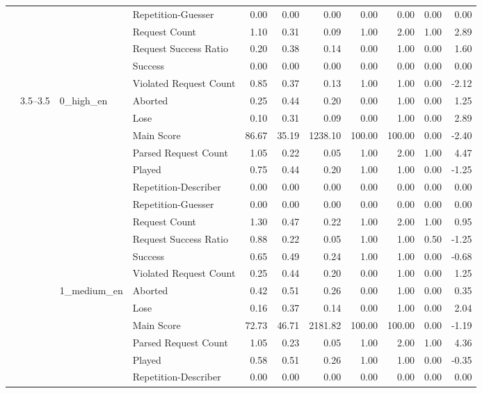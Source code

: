 \begin{tabular}{llllrrrrrrr}
 &  &  & Repetition-Guesser & 0.00 & 0.00 & 0.00 & 0.00 & 0.00 & 0.00 & 0.00 \\
 &  &  & Request Count & 1.10 & 0.31 & 0.09 & 1.00 & 2.00 & 1.00 & 2.89 \\
 &  &  & Request Success Ratio & 0.20 & 0.38 & 0.14 & 0.00 & 1.00 & 0.00 & 1.60 \\
 &  &  & Success & 0.00 & 0.00 & 0.00 & 0.00 & 0.00 & 0.00 & 0.00 \\
 &  &  & Violated Request Count & 0.85 & 0.37 & 0.13 & 1.00 & 1.00 & 0.00 & -2.12 \\
\cline{2-11} \cline{3-11}
 & \multirow[t]{33}{*}{3.5--3.5} & \multirow[t]{11}{*}{0_high_en} & Aborted & 0.25 & 0.44 & 0.20 & 0.00 & 1.00 & 0.00 & 1.25 \\
 &  &  & Lose & 0.10 & 0.31 & 0.09 & 0.00 & 1.00 & 0.00 & 2.89 \\
 &  &  & Main Score & 86.67 & 35.19 & 1238.10 & 100.00 & 100.00 & 0.00 & -2.40 \\
 &  &  & Parsed Request Count & 1.05 & 0.22 & 0.05 & 1.00 & 2.00 & 1.00 & 4.47 \\
 &  &  & Played & 0.75 & 0.44 & 0.20 & 1.00 & 1.00 & 0.00 & -1.25 \\
 &  &  & Repetition-Describer & 0.00 & 0.00 & 0.00 & 0.00 & 0.00 & 0.00 & 0.00 \\
 &  &  & Repetition-Guesser & 0.00 & 0.00 & 0.00 & 0.00 & 0.00 & 0.00 & 0.00 \\
 &  &  & Request Count & 1.30 & 0.47 & 0.22 & 1.00 & 2.00 & 1.00 & 0.95 \\
 &  &  & Request Success Ratio & 0.88 & 0.22 & 0.05 & 1.00 & 1.00 & 0.50 & -1.25 \\
 &  &  & Success & 0.65 & 0.49 & 0.24 & 1.00 & 1.00 & 0.00 & -0.68 \\
 &  &  & Violated Request Count & 0.25 & 0.44 & 0.20 & 0.00 & 1.00 & 0.00 & 1.25 \\
\cline{3-11}
 &  & \multirow[t]{11}{*}{1_medium_en} & Aborted & 0.42 & 0.51 & 0.26 & 0.00 & 1.00 & 0.00 & 0.35 \\
 &  &  & Lose & 0.16 & 0.37 & 0.14 & 0.00 & 1.00 & 0.00 & 2.04 \\
 &  &  & Main Score & 72.73 & 46.71 & 2181.82 & 100.00 & 100.00 & 0.00 & -1.19 \\
 &  &  & Parsed Request Count & 1.05 & 0.23 & 0.05 & 1.00 & 2.00 & 1.00 & 4.36 \\
 &  &  & Played & 0.58 & 0.51 & 0.26 & 1.00 & 1.00 & 0.00 & -0.35 \\
 &  &  & Repetition-Describer & 0.00 & 0.00 & 0.00 & 0.00 & 0.00 & 0.00 & 0.00 \\

\end{tabular}

